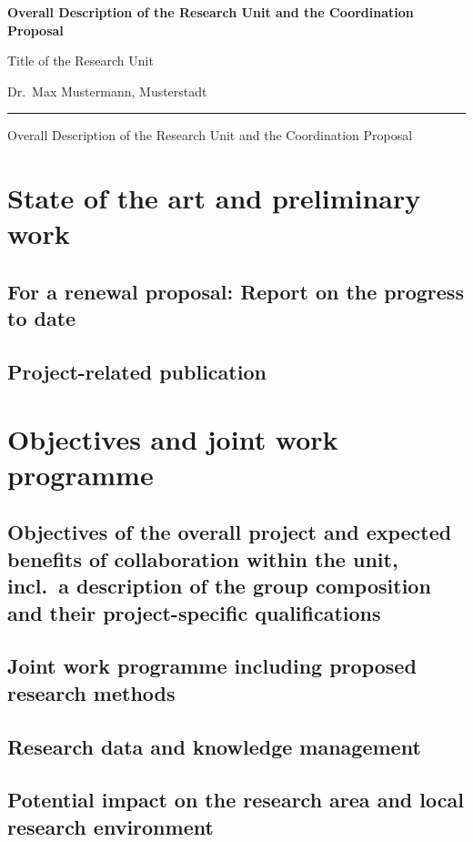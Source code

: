 \documentclass{scrartcl}
\newcommand{\spokesperson}{Dr.\ Max Mustermann, Musterstadt}
\newcommand{\project}{Title of the Research Unit}
\begin{document}
{\raggedright{} \normalsize \bfseries 
	Overall Description of the Research Unit and the Coordination Proposal \par
    \project{} \par
    \spokesperson{} \par
	\rule{\textwidth}{0.5pt} \par
	Overall Description of the Research Unit and the Coordination Proposal
}

\section{State of the art and preliminary work}

\subsection{For a renewal proposal: Report on the progress to date}

\subsection{Project-related publication}
\printbibliography[heading=none]


\section{Objectives and joint work programme}

\subsection{Objectives of the overall project and expected benefits of collaboration within the unit, incl.\ a description of the group composition and their project-specific qualifications}

\subsection{Joint work programme including proposed research methods}

\subsection{Research data and knowledge management}

\subsection{Potential impact on the research area and local research environment}
\end{document}
